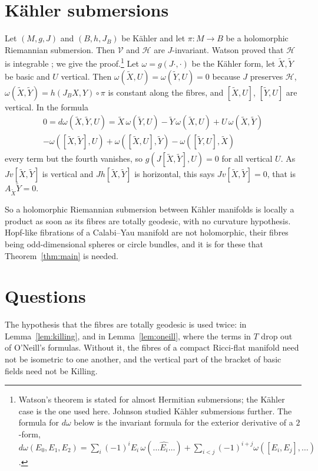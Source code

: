 \documentclass[11pt,reqno]{amsart}
\theoremstyle{plain}
\theoremstyle{definition}
\newcommand{\hor}{\mathcal{H}}
\newcommand{\ver}{\mathcal{V}}
\newcommand{\bas}[1]{\widetilde{#1}}
\begin{document}
\section{K\"ahler submersions}\label{sec:kahler}

Let $(M,g,J)$ and $(B,h,J_B)$ be K\"ahler and let $\pi\colon M\to B$ be a holomorphic Riemannian submersion. Then $\ver$ and $\hor$ are $J$-invariant. Watson proved that $\hor$ is integrable \cite{Watson1976}; we give the proof.\footnote{Watson's theorem is stated for almost Hermitian submersions; the K\"ahler case is the one used here. Johnson \cite{Johnson1980} studied K\"ahler submersions further. The formula for $d\omega$ below is the invariant formula for the exterior derivative of a $2$-form, $d\omega(E_0,E_1,E_2)=\sum_i(-1)^iE_i\,\omega(\dots\widehat{E_i}\dots)+\sum_{i<j}(-1)^{i+j}\omega([E_i,E_j],\dots)$.} Let $\omega=g(J\cdot,\cdot)$ be the K\"ahler form, let $\bas X,\bas Y$ be basic and $U$ vertical. Then $\omega(\bas X,U)=\omega(\bas Y,U)=0$ because $J$ preserves $\hor$, $\omega(\bas X,\bas Y)=h(J_BX,Y)\circ\pi$ is constant along the fibres, and $[\bas X,U]$, $[\bas Y,U]$ are vertical. In the formula
\begin{multline}
0=d\omega(\bas X,\bas Y,U)=\bas X\,\omega(\bas Y,U)-\bas Y\,\omega(\bas X,U)+U\,\omega(\bas X,\bas Y)\\
-\omega([\bas X,\bas Y],U)+\omega([\bas X,U],\bas Y)-\omega([\bas Y,U],\bas X)
\end{multline}
every term but the fourth vanishes, so $g(J[\bas X,\bas Y],U)=0$ for all vertical $U$. As $Jv[\bas X,\bas Y]$ is vertical and $Jh[\bas X,\bas Y]$ is horizontal, this says $Jv[\bas X,\bas Y]=0$, that is $A_{\bas X}\bas Y=0$.

So a holomorphic Riemannian submersion between K\"ahler manifolds is locally a product as soon as its fibres are totally geodesic, with no curvature hypothesis. Hopf-like fibrations of a Calabi--Yau manifold are not holomorphic, their fibres being odd-dimensional spheres or circle bundles, and it is for these that Theorem~\ref{thm:main} is needed.

\section{Questions}\label{sec:questions}

The hypothesis that the fibres are totally geodesic is used twice: in Lemma~\ref{lem:killing}, and in Lemma~\ref{lem:oneill}, where the terms in $T$ drop out of O'Neill's formulas. Without it, the fibres of a compact Ricci-flat manifold need not be isometric to one another, and the vertical part of the bracket of basic fields need not be Killing.
\end{document}
